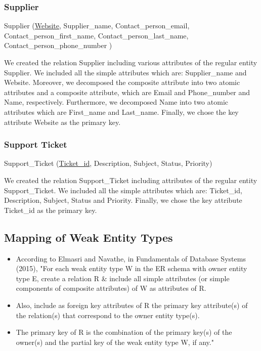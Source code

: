 \subsubsection{Supplier}

Supplier (\underline{Website}, Supplier\_name, Contact\_person\_email, \\
Contact\_person\_first\_name, Contact\_person\_last\_name, Contact\_person\_phone\_number )

We created the relation Supplier including various attributes of the regular entity Supplier. We included all the simple attributes which are: Supplier\_name and Website. Moreover, we decomposed the composite attribute into two atomic attributes and a composite attribute, which are Email and Phone\_number and Name, respectively. Furthermore, we decomposed Name into two atomic attributes which are First\_name and Last\_name. Finally, we chose the key attribute Website as the primary key.

\subsubsection{Support Ticket}

Support\_Ticket (\underline{Ticket\_id}, Description, Subject, Status, Priority)

We created the relation Support\_Ticket including attributes of the regular entity Support\_Ticket. We included all the simple attributes which are: Ticket\_id, Description, Subject, Status and Priority.  Finally, we chose the key attribute Ticket\_id as the primary key.

\subsection{Mapping of Weak Entity Types}

\begin{itemize}
  \item	According to Elmasri and Navathe, in Fundamentals of Database Systems (2015), "For each weak entity type W in the ER schema with owner entity type E, create a relation R \& include all simple attributes (or simple components of composite attributes) of W as attributes of R.
  \item	Also, include as foreign key attributes of R the primary key attribute(s) of the relation(s) that correspond to the owner entity type(s).
  \item	The primary key of R is the combination of the primary key(s) of the owner(s) and the partial key of the weak entity type W, if any." \cite{elmasri}
\end{itemize}

